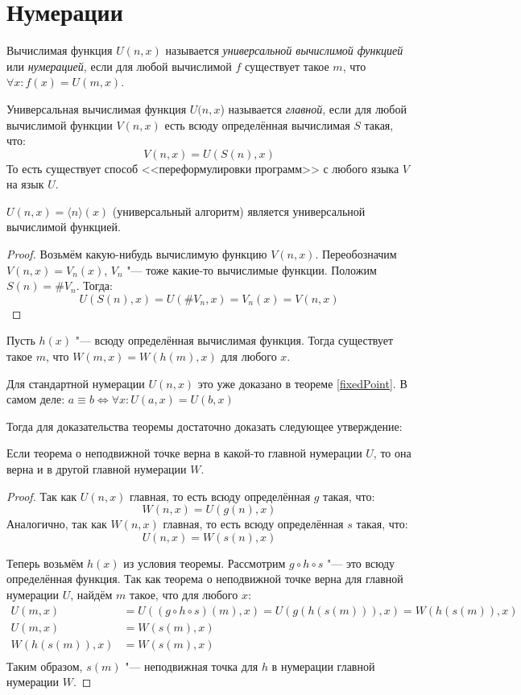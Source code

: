 \section{Нумерации}
\begin{Def}
	Вычислимая функция $U(n, x)$ называется \textit{универсальной вычислимой функцией} или \textit{нумерацией}, если для любой
	вычислимой $f$ существует такое $m$, что $\forall x \colon f(x) = U(m, x)$.
\end{Def}
\begin{Def}
	Универсальная вычислимая функция $U(n, x$) называется \textit{главной}, если для любой вычислимой функции $V(n, x)$
	есть всюду определённая вычислимая $S$ такая, что:
	\[ V(n, x) = U(S(n), x) \]
	То есть существует способ <<переформулировки программ>> с любого языка $V$ на язык $U$.
\end{Def}
\begin{exmp}
	$U(n, x) = \langle n \rangle(x)$ (универсальный алгоритм) является универсальной вычислимой функцией.
\end{exmp}
\begin{proof}
	Возьмём какую-нибудь вычислимую функцию $V(n, x)$.
	Переобозначим $V(n, x)=V_n(x)$, $V_n$ "--- тоже какие-то вычислимые функции.
	Положим $S(n)=\# V_n$.
	Тогда:
	\[ U(S(n), x) = U(\# V_n, x) = V_n(x) = V(n, x) \]
\end{proof}

\begin{theorem}
	Пусть $h(x)$ "--- всюду определённая вычислимая функция.
	Тогда существует такое $m$, что $W(m, x) = W(h(m), x)$ для любого $x$.
\end{theorem}
\begin{Rem}
	Для стандартной нумерации $U(n, x)$ это уже доказано в теореме \ref{fixedPoint}.
	В самом деле: $a \equiv b \iff \forall x \colon U(a, x) = U(b, x)$
\end{Rem}
Тогда для доказательства теоремы достаточно доказать следующее утверждение:
\begin{assertion}
	Если теорема о неподвижной точке верна в какой-то главной нумерации $U$, то она
	верна и в другой главной нумерации $W$.
\end{assertion}
\begin{proof}
	Так как $U(n, x)$ главная, то есть всюду определённая $g$ такая, что:
	\[ W(n, x) = U(g(n), x) \]
	Аналогично, так как $W(n, x)$ главная, то есть всюду определённая $s$ такая, что:
	\[ U(n, x) = W(s(n), x) \]

	Теперь возьмём $h(x)$ из условия теоремы.
	Рассмотрим $g \circ h \circ s$ "--- это всюду определённая функция.
	Так как теорема о неподвижной точке верна для главной нумерации $U$, найдём $m$ такое, что для любого $x$:
	\begin{align*}
	U(m, x)	&= U((g \circ h \circ s)(m), x)	= U(g(h(s(m))), x)= W(h(s(m)), x) \\
	U(m, x) &= W(s(m), x) \\
	W(h(s(m)), x) &= W(s(m), x) \\
	\end{align*}
	Таким образом, $s(m)$ "--- неподвижная точка для $h$ в нумерации главной нумерации $W$.
\end{proof}

